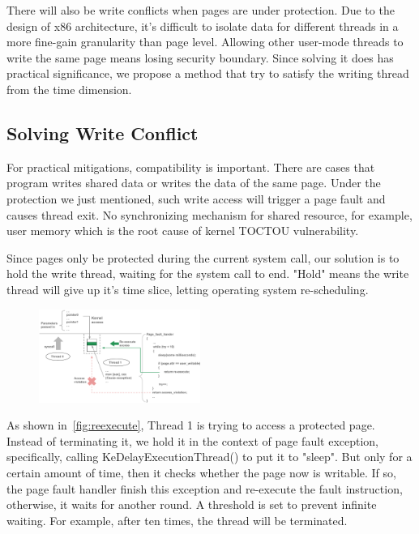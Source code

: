 There will also be write conflicts when pages are under protection. Due to the design of x86 architecture, it's difficult to isolate data for different threads in a more fine-gain granularity than page level. Allowing other user-mode threads to write the same page means losing security boundary. Since solving it does has practical significance, we propose a method that try to satisfy the writing thread from the time dimension.


\subsection{Solving Write Conflict }

For practical mitigations, compatibility is important. There are cases that program writes shared data or writes the data of the same page. Under the protection we just mentioned, such write access will trigger a page fault and causes thread exit. No synchronizing mechanism for shared resource, for example, user memory which is the root cause of kernel TOCTOU vulnerability. 

Since pages only be protected during the current system call, our solution is to hold the write thread, waiting for the system call to end. "Hold" means the write thread will give up it's time slice, letting operating system re-scheduling. 

\begin{figure}[th]
  \includegraphics[width=0.47\textwidth]{figures/reexecute}
  \centering
  \caption{}
  \label{fig:reexecute}
\end{figure}

As shown in~\autoref{fig:reexecute}, Thread 1 is trying to access a protected page. Instead of terminating it, we hold it in the context of page fault exception, specifically, calling KeDelayExecutionThread() to put it to "sleep". But only for a certain amount of time, then it checks whether the page now is writable. If so, the page fault handler finish this exception and re-execute the fault instruction, otherwise, it waits for another round. A threshold is set to prevent infinite waiting. For example, after ten times, the thread will be terminated.

